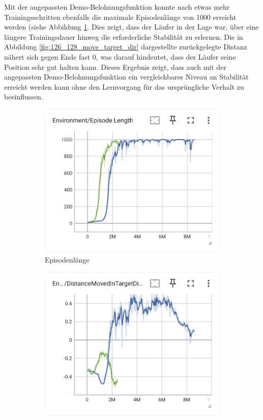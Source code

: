Mit der angepassten Demo-Belohnungsfunktion konnte nach etwas mehr Trainingsschritten ebenfalls die maximale Episodenlänge von 1000 erreicht werden (siehe Abbildung \ref{fig:126_128_episode_length}. Dies zeigt, dass der Läufer in der Lage war, über eine längere Trainingsdauer hinweg die erforderliche Stabilität zu erlernen. Die in Abbildung \ref{fig:126_128_move_target_dir} dargestellte zurückgelegte Distanz nähert sich gegen Ende fast 0, was darauf hindeutet, dass der Läufer seine Position sehr gut halten kann. Dieses Ergebnis zeigt, dass auch mit der angepassten Demo-Belohnungsfunktion ein vergleichbares Niveau an Stabilität erreicht werden kann ohne den Lernvorgang für das ursprüngliche Verhalt zu beeinflussen.

\begin{figure}[H]
  \centering  
  \begin{subfigure}{.49\textwidth}
      \centering  
      \includegraphics[width=\textwidth]{img/126_128_episode_length}
      \caption{Episodenlänge}
      \label{fig:126_128_episode_length}
    \end{subfigure}
    \begin{subfigure}{.49\textwidth}
      \centering  
      \includegraphics[width=\textwidth]{img/126_128_move_target_dir}

\end{subfigure}
\end{figure}
